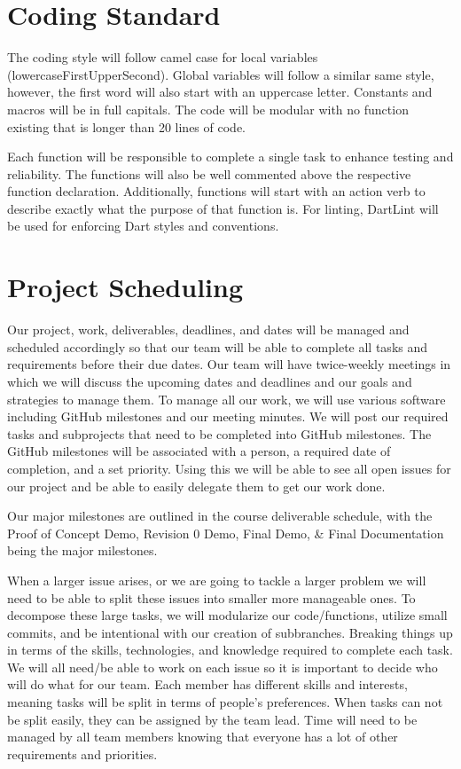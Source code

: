 \documentclass{article}
\begin{document}
\section{Coding Standard}

The coding style will follow camel case for local variables (lowercaseFirstUpperSecond). Global variables will follow a similar same style, however, the first word will also start with an uppercase letter. Constants and macros will be in full capitals. The code will be modular with no function existing that is longer than 20 lines of code. 

Each function will be responsible to complete a single task to enhance testing and reliability. The functions will also be well commented above the respective function declaration. Additionally, functions will start with an action verb to describe exactly what the purpose of that function is. For linting, DartLint will be used for enforcing Dart styles and conventions.

\section{Project Scheduling}

Our project, work, deliverables, deadlines, and dates will be managed and scheduled accordingly so that our team will be able to complete all tasks and requirements before their due dates. Our team will have twice-weekly meetings in which we will discuss the upcoming dates and deadlines and our goals and strategies to manage them. To manage all our work, we will use various software including GitHub milestones and our meeting minutes. We will post our required tasks and subprojects that need to be completed into GitHub milestones. The GitHub milestones will be associated with a person, a required date of completion, and a set priority. Using this we will be able to see all open issues for our project and be able to easily delegate them to get our work done. 

Our major milestones are outlined in the course deliverable schedule, with the Proof of Concept Demo, Revision 0 Demo, Final Demo, \& Final Documentation being the major milestones. 

When a larger issue arises, or we are going to tackle a larger problem we will need to be able to split these issues into smaller more manageable ones. To decompose these large tasks, we will modularize our code/functions, utilize small commits, and be intentional with our creation of subbranches. Breaking things up in terms of the skills, technologies, and knowledge required to complete each task. We will all need/be able to work on each issue so it is important to decide who will do what for our team. Each member has different skills and interests, meaning tasks will be split in terms of people’s preferences. When tasks can not be split easily, they can be assigned by the team lead. Time will need to be managed by all team members knowing that everyone has a lot of other requirements and priorities.
\end{document}
